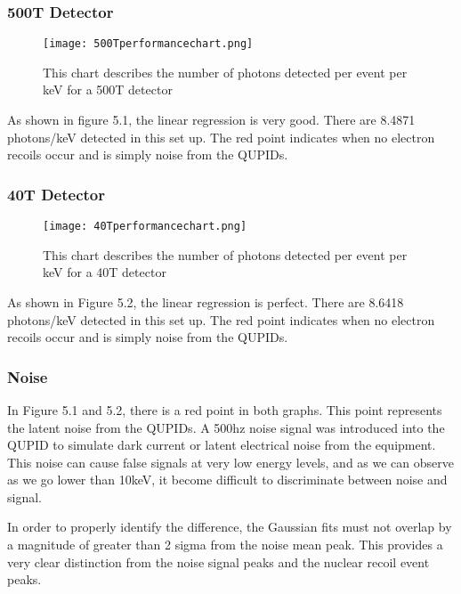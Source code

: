 \documentclass[11pt,a4paper,oneside]{report}
\begin{document}
\subsubsection{500T Detector}

\begin{figure}[h]
\centering
\texttt{[image: 500Tperformancechart.png]}
\caption{This chart describes the number of photons detected per event per keV for a 500T detector}
\end{figure}

As shown in figure 5.1, the linear regression is very good. There are 8.4871 photons/keV detected in this set up. The red point indicates when no electron recoils occur and is simply noise from the QUPIDs.  

\newpage
\subsubsection{40T Detector}
\begin{figure}[h]
\centering
\texttt{[image: 40Tperformancechart.png]}
\caption{This chart describes the number of photons detected per event per keV for a 40T detector}
\end{figure}

As shown in Figure 5.2, the linear regression is perfect. There are 8.6418 photons/keV detected in this set up. The red point indicates when no electron recoils occur and is simply noise from the QUPIDs. 

\subsubsection{Noise}
In Figure 5.1 and 5.2, there is a red point in both graphs. This point represents the latent noise from the QUPIDs. A 500hz noise signal was introduced into the QUPID to simulate dark current or latent electrical noise from the equipment. This noise can cause false signals at very low energy levels, and as we can observe as we go lower than 10keV, it become difficult to discriminate between noise and signal. 

In order to properly identify the difference, the Gaussian fits must not overlap by a magnitude of greater than 2 sigma from the noise mean peak. This provides a very clear distinction from the noise signal peaks and the nuclear recoil event peaks. 

\end{document}
